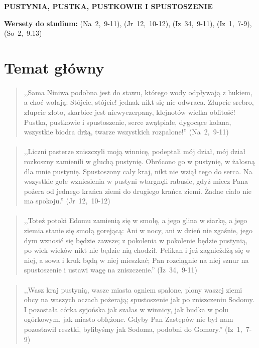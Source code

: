 \documentclass[10pt,a4paper,oneside]{article}
\begin{document}
\centerline{\textbf{\MakeUppercase{Pustynia, pustka, pustkowie i spustoszenie}}}
\begin{center}
\textbf{Wersety do studium:} 
\mbox{(Na 2, 9-11)}, \mbox{(Jr 12, 10-12)}, \mbox{(Iz 34, 9-11)}, \mbox{(Iz 1, 7-9)}, \mbox{(So 2, 9.13)}
\end{center}
\section{Temat główny}
\paragraph{}
\begin{quote}
,,Sama Niniwa podobna jest do stawu, którego wody odpływają z hukiem, a choć wołają: Stójcie, stójcie! jednak nikt się nie odwraca. Złupcie srebro, złupcie złoto, skarbiec jest niewyczerpany, klejnotów wielka obfitość! Pustka, pustkowie i spustoszenie, serce zwątpiałe, dygocące kolana, wszystkie biodra drżą, twarze wszystkich rozpalone!'' \mbox{(Na 2, 9-11)}
\end{quote}
\paragraph{}
\begin{quote}
,,Liczni pasterze zniszczyli moją winnicę, podeptali mój dział, mój dział rozkoszny zamienili w głuchą pustynię. Obrócono go w pustynię, w żałosną dla mnie pustynię. Spustoszony cały kraj, nikt nie wziął tego do serca. Na wszystkie gołe wzniesienia w pustyni wtargnęli rabusie, gdyż miecz Pana pożera od jednego krańca ziemi do drugiego krańca ziemi. Żadne ciało nie ma spokoju.'' \mbox{(Jr 12, 10-12)}
\end{quote}
\paragraph{}
\begin{quote}
,,Toteż potoki Edomu zamienią się w smołę, a jego glina w siarkę, a jego ziemia stanie się smołą gorejącą: Ani w nocy, ani w dzień nie zgaśnie, jego dym wznosić się będzie zawsze; z pokolenia w pokolenie będzie pustynią, po wiek wieków nikt nie będzie nią chodził. Pelikan i jeż zagnieżdżą się w niej, a sowa i kruk będą w niej mieszkać; Pan rozciągnie na niej sznur na spustoszenie i ustawi wagę na zniszczenie.'' \mbox{(Iz 34, 9-11)}
\end{quote}
\paragraph{}
\begin{quote}
,,Wasz kraj pustynią, wasze miasta ogniem spalone, plony waszej ziemi obcy na waszych oczach pożerają; spustoszenie jak po zniszczeniu Sodomy. I pozostała córka syjońska jak szałas w winnicy, jak budka w polu ogórkowym, jak miasto oblężone. Gdyby Pan Zastępów nie był nam pozostawił resztki, bylibyśmy jak Sodoma, podobni do Gomory.'' \mbox{(Iz 1, 7-9)}
\end{quote}
\end{document}
